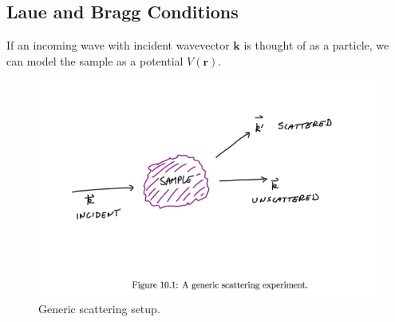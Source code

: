 \documentclass[10pt]{article}
\begin{document}
\subsection{Laue and Bragg Conditions}
If an incoming wave with incident wavevector $\textbf{k}$ is thought of as a particle, we can model the sample as a potential $V(\textbf{r})$.
\begin{figure}
  \includegraphics[width=\linewidth]{scattering1.png}
  \caption{Generic scattering setup.}
\end{figure}
\end{document}
